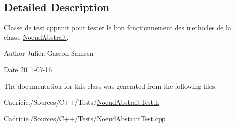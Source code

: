 \subsection{Detailed Description}
Classe de test cppunit pour tester le bon fonctionnement des methodes de la classe \hyperlink{class_noeud_abstrait}{Noeud\-Abstrait}. 

\begin{DoxyAuthor}{Author}
Julien Gascon-\/\-Samson 
\end{DoxyAuthor}
\begin{DoxyDate}{Date}
2011-\/07-\/16 
\end{DoxyDate}


The documentation for this class was generated from the following files\-:\begin{DoxyCompactItemize}
\item 
Cadriciel/\-Sources/\-C++/\-Tests/\hyperlink{_noeud_abstrait_test_8h}{Noeud\-Abstrait\-Test.\-h}\item 
Cadriciel/\-Sources/\-C++/\-Tests/\hyperlink{_noeud_abstrait_test_8cpp}{Noeud\-Abstrait\-Test.\-cpp}\end{DoxyCompactItemize}
